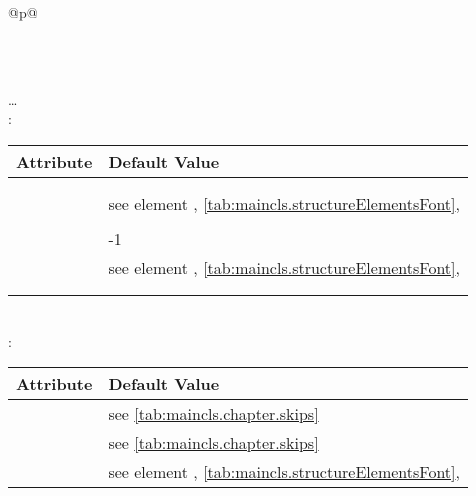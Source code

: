   \begin{longtable}{@{}p{\columnwidth}@{}}
    \caption{Default of the headings of  and
      }%
    \label{tab:maincls.section.defaults}\\
    \endfirsthead
    \caption[]{Default of the headings of  and
       \emph{(Continuation)}}\\
    \addlinespace[-\normalbaselineskip]
    \endhead
    \raggedleft\dots\\
    \endfoot
    \endlastfoot
    : \\*
    \begin{tabularx}{\linewidth}{ll}
    \toprule
    Attribute & Default Value \\
    \midrule
    \PValue{afterskip}   & \PValue{0pt plus 1fil} \\
    \PValue{beforeskip}  & \PValue{0pt plus 1fil + \Length{baselineskip}} \\
    \PValue{font}        & see element \FontElement{part}, 
                           \autoref{tab:maincls.structureElementsFont}, 
                           \autopageref{tab:maincls.structureElementsFont} \\
    \PValue{innerskip}   & \PValue{20pt} \\
    \PValue{level}       & -1 \\
    \PValue{prefixfont}  & see element \FontElement{partnumber},
                           \autoref{tab:maincls.structureElementsFont}, 
                           \autopageref{tab:maincls.structureElementsFont} \\
    \PValue{tocindent}   & \PValue{0pt} \\
    \PValue{tocnumwidth} & \PValue{2em} \\
    \bottomrule
    \end{tabularx} \\
    \addlinespace[\normalbaselineskip]
    : \\*
    \begin{tabularx}{\linewidth}{ll}
    \toprule
    Attribute & Default Value \\
    \midrule
    \PValue{afterskip}   & see \autoref{tab:maincls.chapter.skips} \\
    \PValue{beforeskip}  & see \autoref{tab:maincls.chapter.skips} \\
    \PValue{font}        & see element \FontElement{chapter},
                           \autoref{tab:maincls.structureElementsFont}, 

\end{tabularx}
\end{longtable}
